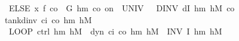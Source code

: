 \documentclass[envcountsame,envcountsect]{llncs}
\newcommand{\IF}[3]{\mathbf{if}\ #1\ \mathbf{then}\ #2\ \mathbf{else}\ #3}
\begin{document}
\begin{example}
\begin{isabellebody}
\ \ ELSE\ {\isacharparenleft}x{\isasymacute}{\isacharequal}\ f\ {\isacharparenleft}{\isacharminus}c\isactrlsub o{\isacharparenright}\ {\isacharampersand}\ G\ h\isactrlsub m\ {\isacharparenleft}{\isacharminus}c\isactrlsub o{\isacharparenright}\ on\ {\isacharbraceleft}{}{\isachardot}{\isachardot}{\isasymtau}{\isacharbraceright}\ UNIV\ {\isacharat}\ {}\ DINV\ {\isacharparenleft}dI\ h\isactrlsub m\ h\isactrlsub M\ {\isacharparenleft}{\isacharminus}c\isactrlsub o{\isacharparenright}{\isacharparenright}{\isacharparenright}{\isacharparenright}{\isachardoublequoteclose}\isanewline
\isanewline
{}\isamarkupfalse%
\ {\isachardoublequoteopen}tank{\isacharunderscore}dinv\ c\isactrlsub i\ c\isactrlsub o\ h\isactrlsub m\ h\isactrlsub M\ {\isasymtau}\ {\isasymequiv}\isanewline 
\ \ LOOP\ {\isacharparenleft}ctrl\ h\isactrlsub m\ h\isactrlsub M\ {\isacharsemicolon}\ dyn\ c\isactrlsub i\ c\isactrlsub o\ h\isactrlsub m\ h\isactrlsub M\ {\isasymtau}{\isacharparenright}\ INV\ {\isacharparenleft}I\ h\isactrlsub m\ h\isactrlsub M{\isacharparenright}{\isachardoublequoteclose}\isanewline
\end{isabellebody}
%


\end{example}
\end{document}
